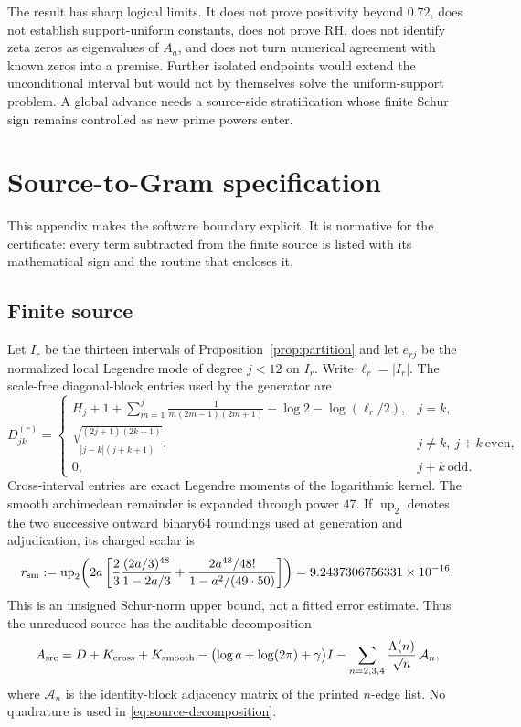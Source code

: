 \documentclass[10pt]{article}
\begin{document}
The result has sharp logical limits.  It does not prove positivity beyond
$0.72$, does not establish support-uniform constants, does not prove RH, does
not identify zeta zeros as eigenvalues of $A_a$, and does not turn numerical
agreement with known zeros into a premise.  Further isolated endpoints would
extend the unconditional interval but would not by themselves solve the
uniform-support problem.  A global advance needs a source-side stratification
whose finite Schur sign remains controlled as new prime powers enter.

\appendix
\section{Source-to-Gram specification}

This appendix makes the software boundary explicit.  It is normative for the
certificate: every term subtracted from the finite source is listed with its
mathematical sign and the routine that encloses it.

\subsection{Finite source}

Let $I_r$ be the thirteen intervals of Proposition~\ref{prop:partition} and
let $e_{rj}$ be the normalized local Legendre mode of degree $j<12$ on $I_r$.
Write $\ell_r=|I_r|$.  The scale-free diagonal-block entries used by the
generator are
\begin{equation}\label{eq:source-diagonal}
 D^{(r)}_{jk}=\begin{cases}
 H_j+1+\displaystyle\sum_{m=1}^{j}\frac{1}{m(2m-1)(2m+1)}
       -\log2-\log(\ell_r/2),&j=k,\\[3pt]
 \displaystyle\frac{\sqrt{(2j+1)(2k+1)}}{|j-k|(j+k+1)},
       &j\ne k,\ j+k\ \text{even},\\
 0,&j+k\ \text{odd}.
 \end{cases}
\end{equation}
Cross-interval entries are exact Legendre moments of the logarithmic kernel.
The smooth archimedean remainder is expanded through power $47$.  If
$\operatorname{up}_2$ denotes the two successive outward binary64 roundings
used at generation and adjudication, its charged scalar is
\begin{equation}\label{eq:rsm}
 r_{\rm sm}:=\operatorname{up}_2\!\left(
 2a\left[\frac{2}{3}\frac{(2a/3)^{48}}{1-2a/3}
 +\frac{2a^{48}/48!}{1-a^2/(49\cdot50)}\right]\right)
 =9.2437306756331\times10^{-16}.
\end{equation}
This is an unsigned Schur-norm upper bound, not a fitted error estimate.  Thus
the unreduced source has the auditable decomposition
\begin{equation}\label{eq:source-decomposition}
 A_{\rm src}=D+K_{\rm cross}+K_{\rm smooth}
 -\bigl(\log a+\log(2\pi)+\gamma\bigr)I
 -\sum_{n=2,3,4}\frac{\Lambda(n)}{\sqrt n}\,\mathcal A_n,
\end{equation}
where $\mathcal A_n$ is the identity-block adjacency matrix of the printed
$n$-edge list.  No quadrature is used in \eqref{eq:source-decomposition}.
\end{document}
